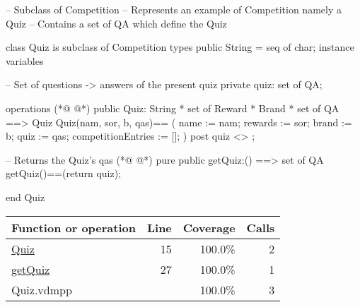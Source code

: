 \begin{vdmpp}[breaklines=true]
-- Subclass of Competition
-- Represents an example of Competition namely a Quiz
-- Contains a set of QA which define the Quiz

class Quiz is subclass of Competition
  types 
   public String = seq of char;   
  instance variables
  
   -- Set of questions -> answers of the present quiz
   private quiz: set of QA;
   
  
  operations
(*@
\label{Quiz:15}
@*)
   public Quiz: String * set of Reward * Brand * set of QA ==> Quiz
   Quiz(nam, sor, b, qas)== 
   (
     name := nam;
     rewards := sor;
     brand := b;
     quiz := qas;
     competitionEntries := [];
   )
   post quiz <> {};
   
   -- Returns the Quiz's qas
(*@
\label{getQuiz:27}
@*)
   pure public getQuiz:() ==> set of QA
    getQuiz()==(return quiz); 
    

end Quiz
\end{vdmpp}
\bigskip
\begin{longtable}{|l|r|r|r|}
\hline
Function or operation & Line & Coverage & Calls \\
\hline
\hline
\hyperref[Quiz:15]{Quiz} & 15&100.0\% & 2 \\
\hline
\hyperref[getQuiz:27]{getQuiz} & 27&100.0\% & 1 \\
\hline
\hline
Quiz.vdmpp & & 100.0\% & 3 \\
\hline
\end{longtable}

